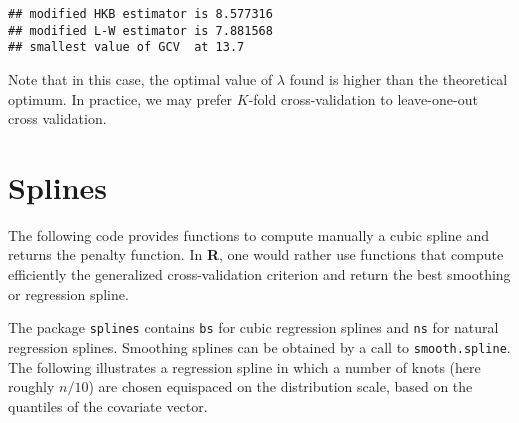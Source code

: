 \documentclass[]{book}
\theoremstyle{definition}
\theoremstyle{definition}
\theoremstyle{definition}
\theoremstyle{remark}
\begin{document}
\begin{verbatim}
## modified HKB estimator is 8.577316 
## modified L-W estimator is 7.881568 
## smallest value of GCV  at 13.7
\end{verbatim}

Note that in this case, the optimal value of \(\lambda\) found is higher than the theoretical optimum. In practice, we may prefer \(K\)-fold cross-validation to leave-one-out cross validation.

\hypertarget{splines}{%
\chapter{Splines}\label{splines}}

The following code provides functions to compute manually a cubic spline
and returns the penalty function. In \textbf{R}, one would rather use functions
that compute efficiently the generalized cross-validation criterion and return
the best smoothing or regression spline.

The package \texttt{splines} contains \texttt{bs} for cubic regression splines and \texttt{ns} for natural regression splines. Smoothing splines can be obtained by a call to \texttt{smooth.spline}.
The following illustrates a regression spline in which a number of knots (here roughly \(n/10\)) are chosen equispaced on the distribution scale, based on the quantiles of the covariate vector.
\end{document}
